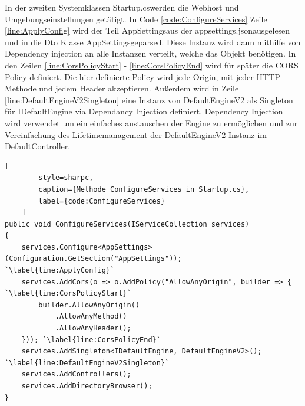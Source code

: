 In der zweiten Systemklassen \grqq Startup.cs\grqq\space werden die
Webhost und Umgebungseinstellungen getätigt.
In Code \ref{code:ConfigureServices} Zeile \ref{line:ApplyConfig}
wird der Teil \grqq AppSettings\grqq\space aus der
\grqq appsettings.json\grqq\space ausgelesen und in die Dto Klasse
\grqq AppSettings\grqq\space geparsed. Diese Instanz wird dann
mithilfe von Dependency injection an alle Instanzen verteilt,
welche das Objekt benötigen. In den Zeilen \ref{line:CorsPolicyStart}
- \ref{line:CorsPolicyEnd} wird für später die CORS Policy definiert.
Die hier definierte Policy wird jede Origin, mit jeder HTTP Methode
und jedem Header akzeptieren. Außerdem wird in Zeile
\ref{line:DefaultEngineV2Singleton} eine Instanz von DefaultEngineV2
als Singleton für IDefaultEngine via Dependancy Injection definiert.
Dependency Injection wird verwendet um ein einfaches austauschen der
Engine zu ermöglichen und zur Vereinfachung des Lifetimemanagement
der DefaultEngineV2 Instanz im DefaultController.

\begin{codeblock}
	\begin{lstlisting}[
		style=sharpc,
		caption={Methode ConfigureServices in Startup.cs},
		label={code:ConfigureServices}
	]
public void ConfigureServices(IServiceCollection services)
{
	services.Configure<AppSettings>(Configuration.GetSection("AppSettings"));	`\label{line:ApplyConfig}`
	services.AddCors(o => o.AddPolicy("AllowAnyOrigin", builder => { `\label{line:CorsPolicyStart}`
		builder.AllowAnyOrigin()
			.AllowAnyMethod()
			.AllowAnyHeader();
	})); `\label{line:CorsPolicyEnd}`
	services.AddSingleton<IDefaultEngine, DefaultEngineV2>(); `\label{line:DefaultEngineV2Singleton}`
	services.AddControllers();
	services.AddDirectoryBrowser();
}
	\end{lstlisting}
\end{codeblock}

